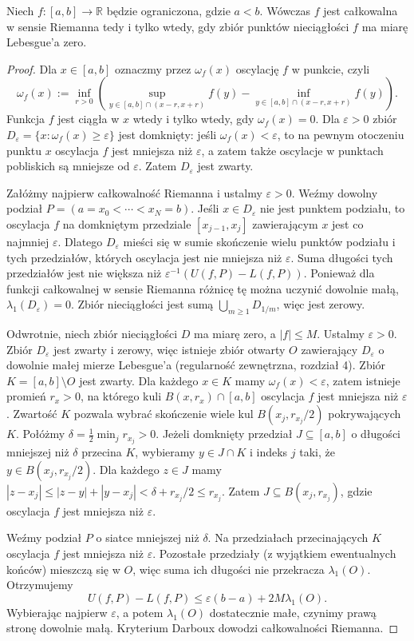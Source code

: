 \begin{twierdzenie}
\label{thm:riemann-criterion}
Niech $f:[a,b]\to\mathbb R$ będzie ograniczona, gdzie
$a<b$. Wówczas $f$ jest całkowalna w sensie Riemanna
tedy i tylko wtedy, gdy zbiór punktów nieciągłości $f$
ma miarę Lebesgue'a zero.
\end{twierdzenie}
\begin{proof}
Dla $x\in[a,b]$ oznaczmy przez $\omega_f(x)$
oscylację $f$ w punkcie, czyli
\[
\omega_f(x):=\inf_{r>0}
\left(\sup_{y\in[a,b]\cap(x-r,x+r)}f(y)
-\inf_{y\in[a,b]\cap(x-r,x+r)}f(y)\right).
\]
Funkcja $f$ jest ciągła w $x$ wtedy i tylko wtedy,
gdy $\omega_f(x)=0$. Dla $\varepsilon>0$ zbiór
$D_\varepsilon=\{x:\omega_f(x)\ge\varepsilon\}$
jest domknięty: jeśli $\omega_f(x)<\varepsilon$,
to na pewnym otoczeniu punktu $x$ oscylacja $f$
jest mniejsza niż $\varepsilon$, a zatem także
oscylacje w punktach pobliskich są mniejsze od
$\varepsilon$. Zatem $D_\varepsilon$ jest zwarty.

Załóżmy najpierw całkowalność Riemanna i
ustalmy $\varepsilon>0$. Weźmy dowolny podział
$P=(a=x_0<\cdots<x_N=b)$. Jeśli
$x\in D_\varepsilon$ nie jest punktem podziału,
to oscylacja $f$ na domkniętym przedziale
$[x_{j-1},x_j]$ zawierającym $x$ jest co najmniej
$\varepsilon$. Dlatego $D_\varepsilon$ mieści się
w sumie skończenie wielu punktów podziału i tych
przedziałów, których oscylacja jest nie mniejsza
niż $\varepsilon$. Suma długości tych przedziałów
jest nie większa niż
$\varepsilon^{-1}(U(f,P)-L(f,P))$.
Ponieważ dla funkcji całkowalnej w sensie Riemanna
różnicę tę można uczynić dowolnie małą,
$\lambda_1(D_\varepsilon)=0$.
Zbiór nieciągłości jest sumą
$\bigcup_{m\ge1}D_{1/m}$, więc jest zerowy.

Odwrotnie, niech zbiór nieciągłości $D$ ma miarę
zero, a $|f|\le M$. Ustalmy $\varepsilon>0$.
Zbiór $D_\varepsilon$ jest zwarty i zerowy, więc
istnieje zbiór otwarty $O$ zawierający $D_\varepsilon$
o dowolnie małej mierze Lebesgue'a (regularność
zewnętrzna, rozdział 4). Zbiór
$K=[a,b]\setminus O$ jest zwarty. Dla każdego
$x\in K$ mamy $\omega_f(x)<\varepsilon$,
zatem istnieje promień $r_x>0$, na którego kuli
$B(x,r_x)\cap[a,b]$ oscylacja $f$ jest
mniejsza niż $\varepsilon$. Zwartość $K$ pozwala
wybrać skończenie wiele kul $B(x_j,r_{x_j}/2)$
pokrywających $K$. Połóżmy
$\delta=\frac12\min_j r_{x_j}>0$.
Jeżeli domknięty przedział $J\subseteq[a,b]$
o długości mniejszej niż $\delta$ przecina $K$,
wybieramy $y\in J\cap K$ i indeks $j$ taki, że
$y\in B(x_j,r_{x_j}/2)$. Dla każdego $z\in J$
mamy
$|z-x_j|\le|z-y|+|y-x_j|<\delta+r_{x_j}/2
\le r_{x_j}$.
Zatem $J\subseteq B(x_j,r_{x_j})$, gdzie
oscylacja $f$ jest mniejsza niż $\varepsilon$.

Weźmy podział $P$ o siatce mniejszej niż $\delta$.
Na przedziałach przecinających $K$ oscylacja $f$
jest mniejsza niż $\varepsilon$. Pozostałe
przedziały (z wyjątkiem ewentualnych końców)
mieszczą się w $O$, więc suma ich długości
nie przekracza $\lambda_1(O)$. Otrzymujemy
\[
U(f,P)-L(f,P)
\le\varepsilon(b-a)+2M\lambda_1(O).
\]
Wybierając najpierw $\varepsilon$, a potem
$\lambda_1(O)$ dostatecznie małe, czynimy prawą
stronę dowolnie małą. Kryterium Darboux dowodzi
całkowalności Riemanna.
\end{proof}

